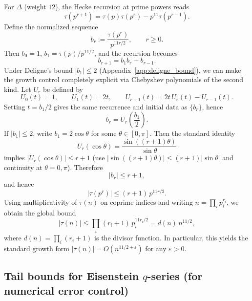 For $\Delta$ (weight $12$), the Hecke recursion at prime powers reads
\begin{equation}
\tau(p^{r+1})=\tau(p)\tau(p^r)-p^{11}\tau(p^{r-1}).
\end{equation}
Define the normalized sequence
\begin{equation}
b_r:=\frac{\tau(p^r)}{p^{11r/2}},\qquad r\ge 0.
\end{equation}
Then $b_0=1$, $b_1=\tau(p)/p^{11/2}$, and the recursion becomes
\begin{equation}
b_{r+1}=b_1 b_r-b_{r-1}.
\end{equation}
Under Deligne's bound $|b_1|\le 2$ (Appendix~\ref{app:deligne_bound}), we can make the growth control completely explicit via Chebyshev polynomials of the second kind. Let $U_r$ be defined by
\begin{equation}
U_0(t)=1,\qquad U_1(t)=2t,\qquad U_{r+1}(t)=2t\,U_r(t)-U_{r-1}(t).
\end{equation}
Setting $t=b_1/2$ gives the same recurrence and initial data as $\{b_r\}$, hence
\begin{equation}
b_r = U_r\!\left(\frac{b_1}{2}\right).
\end{equation}
If $|b_1|\le 2$, write $b_1=2\cos\theta$ for some $\theta\in[0,\pi]$. Then the standard identity
\begin{equation}
U_r(\cos\theta)=\frac{\sin((r+1)\theta)}{\sin\theta}
\end{equation}
implies $|U_r(\cos\theta)|\le r+1$ (use $|\sin((r+1)\theta)|\le (r+1)|\sin\theta|$ and continuity at $\theta=0,\pi$). Therefore
\begin{equation}
|b_r|\le r+1,
\end{equation}
and hence
\begin{equation}
|\tau(p^r)|\le (r+1)\,p^{11r/2}.
\end{equation}
Using multiplicativity of $\tau(n)$ on coprime indices and writing $n=\prod_i p_i^{r_i}$, we obtain the global bound
\begin{equation}
|\tau(n)|\le \prod_i (r_i+1)\,p_i^{11r_i/2} = d(n)\,n^{11/2},
\end{equation}
where $d(n)=\prod_i (r_i+1)$ is the divisor function. In particular, this yields the standard growth form $|\tau(n)|=O(n^{11/2+\varepsilon})$ for any $\varepsilon>0$.

\subsection{Tail bounds for Eisenstein \texorpdfstring{$q$}{q}-series (for numerical error control)}
\label{app:eisenstein_tail_bounds}

